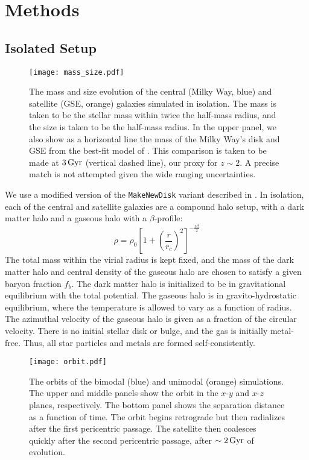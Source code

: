 \section{Methods}\label{sec:methods}
\subsection{Isolated Setup}\label{ssec:iso_setup}
\begin{figure}
    \centering
    \texttt{[image: mass\_size.pdf]}
    \caption{The mass and size evolution of the central (Milky Way, blue) and satellite (GSE, orange) galaxies simulated in isolation. The mass is taken to be the stellar mass within twice the half-mass radius, and the size is taken to be the half-mass radius. In the upper panel, we also show as a horizontal line the mass of the Milky Way's disk and GSE from the best-fit model of \citet{2021ApJ...923...92N}. This comparison is taken to be made at $3\,\textrm{Gyr}$ (vertical dashed line), our proxy for $z\sim2$. A precise match is not attempted given the wide ranging uncertainties.}
    \label{fig:mass_size}
\end{figure}

We use a modified version of the \texttt{MakeNewDisk} variant described in \citet{2023MNRAS.tmp.2070B}. In isolation, each of the central and satellite galaxies are a compound halo setup, with a \citet{1990ApJ...356..359H} dark matter halo and a gaseous halo with a $\beta$-profile:
\begin{equation*}
\rho = \rho_0 \left[1 + \left(\frac{r}{r_c}\right)^2\right]^{-\frac{3\beta}{2}}
\end{equation*}
The total mass within the virial radius is kept fixed, and the mass of the dark matter halo and central density of the gaseous halo are chosen to satisfy a given baryon fraction $f_b$. The dark matter halo is initialized to be in gravitational equilibrium with the total potential. The gaseous halo is in gravito-hydrostatic equilibrium, where the temperature is allowed to vary as a function of radius. The azimuthal velocity of the gaseous halo is given as a fraction of the circular velocity. There is no initial stellar disk or bulge, and the gas is initially metal-free. Thus, all star particles and metals are formed self-consistently.

\begin{figure}
    \centering
    \texttt{[image: orbit.pdf]}
    \caption{The orbits of the bimodal (blue) and unimodal (orange) simulations. The upper and middle panels show the orbit in the $x$-$y$ and $x$-$z$ planes, respectively. The bottom panel shows the separation distance as a function of time. The orbit begins retrograde but then radializes after the first pericentric passage. The satellite then coalesces quickly after the second pericentric passage, after $\sim2\,\textrm{Gyr}$ of evolution.}
    \label{fig:orbit}
\end{figure}

